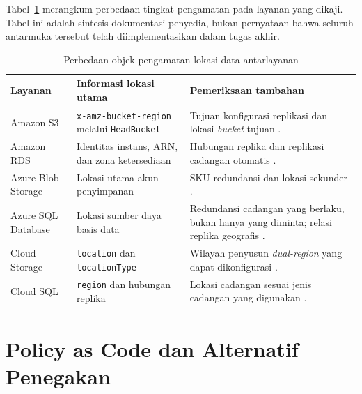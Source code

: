 Tabel~\ref{tab:b2-lokasi-layanan} merangkum perbedaan tingkat pengamatan pada layanan yang dikaji. Tabel ini adalah sintesis dokumentasi penyedia, bukan pernyataan bahwa seluruh antarmuka tersebut telah diimplementasikan dalam tugas akhir.
\begingroup
\small
\setlength{\parskip}{0pt}
\setlength{\tabcolsep}{4pt}
\begin{table}[tbp]
\centering
\caption{Perbedaan objek pengamatan lokasi data antarlayanan}\label{tab:b2-lokasi-layanan}
\begin{tabular}{@{}>{\raggedright\arraybackslash}p{}>{\raggedright\arraybackslash}p{}>{\raggedright\arraybackslash}p{}@{}}
\toprule
Layanan & Informasi lokasi utama & Pemeriksaan tambahan \\
\midrule
Amazon S3 & \texttt{x-amz-\allowbreak bucket-\allowbreak region} melalui \texttt{HeadBucket} & Tujuan konfigurasi replikasi dan lokasi \textit{bucket} tujuan \autocite{b2c_awsHeadBucket,b2c_awsS3Replication}. \\
\addlinespace
Amazon RDS & Identitas instans, ARN, dan zona ketersediaan & Hubungan replika dan replikasi cadangan otomatis \autocite{b2c_awsRdsMetadata,b2c_awsRdsBackupReplication}. \\
\addlinespace
Azure Blob Storage & Lokasi utama akun penyimpanan & SKU redundansi dan lokasi sekunder \autocite{b2c_azureStorageMetadata,b2c_azureStorageRedundancy}. \\
\addlinespace
Azure SQL Database & Lokasi sumber daya basis data & Redundansi cadangan yang berlaku, bukan hanya yang diminta; relasi replika geografis \autocite{b2c_azureSqlMetadata,b2c_azureSqlBackup,b2c_azureSqlGeoReplication}. \\
\addlinespace
Cloud Storage & \texttt{location} dan \texttt{locationType} & Wilayah penyusun \textit{dual-region} yang dapat dikonfigurasi \autocite{b2c_gcpBucketMetadata,b2c_gcpBucketLocations}. \\
\addlinespace
Cloud SQL & \texttt{region} dan hubungan replika & Lokasi cadangan sesuai jenis cadangan yang digunakan \autocite{b2c_gcpSqlMetadata,b2c_gcpSqlBackups}. \\
\bottomrule
\end{tabular}
\end{table}
\endgroup


\section{Policy as Code dan Alternatif Penegakan}
\label{sec:b2c-policy-code}

